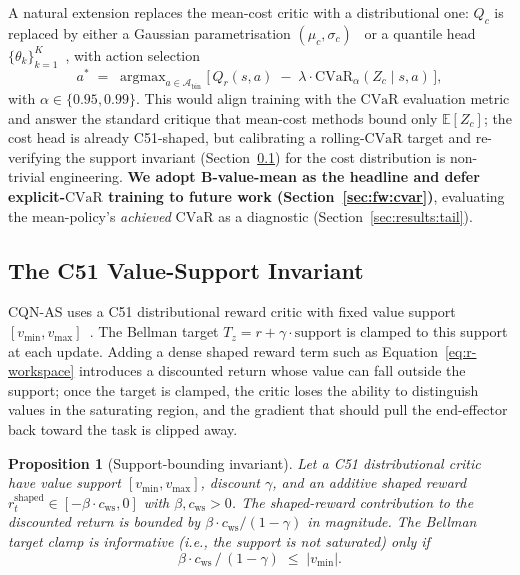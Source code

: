 \documentclass[11pt,a4paper]{report}
\newtheorem{proposition}[theorem]{Proposition}
\newcommand{\cvar}{\ensuremath{\mathrm{CVaR}}}
\newcommand{\cqnas}{CQN-AS}
\begin{document}
A natural extension replaces the mean-cost critic with a
distributional one: $Q_c$ is replaced by either a Gaussian
parametrisation $(\mu_c, \sigma_c)$~\cite{yang2021wcsac} or a
quantile head $\{\theta_k\}_{k=1}^K$~\cite{dabney2018qrdqn}, with
action selection
\begin{equation}
  a^* \;=\; \mathop{\mathrm{argmax}}_{a \in \mathcal{A}_{\mathrm{bin}}}
  \Big[\,Q_r(s,a) \;-\; \lambda \cdot \cvar_{\alpha}(Z_c \mid s, a)\,\Big],
\end{equation}
with $\alpha \in \{0.95, 0.99\}$. This would align training with the
\cvar{} evaluation metric and answer the standard critique that
mean-cost methods bound only $\mathbb{E}[Z_c]$; the cost head is
already C51-shaped, but calibrating a rolling-\cvar{} target and
re-verifying the support invariant
(Section~\ref{sec:method:lagrangian:support}) for the cost
distribution is non-trivial engineering. \textbf{We adopt
B-value-mean as the headline and defer explicit-\cvar{} training to
future work (Section~\ref{sec:fw:cvar})}, evaluating the
mean-policy's \emph{achieved} \cvar{} as a diagnostic
(Section~\ref{sec:results:tail}).

\subsection{The C51 Value-Support Invariant}
\label{sec:method:lagrangian:support}

\cqnas{} uses a C51 distributional reward critic with fixed value
support $[v_{\min}, v_{\max}]$~\cite{bellemare2017c51}. The Bellman
target $T_z = r + \gamma \cdot \mathrm{support}$ is clamped to this
support at each update. Adding a dense shaped reward term such as
Equation~\ref{eq:r-workspace} introduces a discounted return whose
value can fall outside the support; once the target is clamped, the
critic loses the ability to distinguish values in the saturating
region, and the gradient that should pull the end-effector back
toward the task is clipped away.

\begin{proposition}[Support-bounding invariant]
\label{lem:support-bound}
Let a C51 distributional critic have value support
$[v_{\min}, v_{\max}]$, discount $\gamma$, and an additive shaped
reward $r^{\mathrm{shaped}}_t \in [-\beta \cdot c_{\mathrm{ws}}, 0]$
with $\beta, c_{\mathrm{ws}} > 0$. The shaped-reward contribution
to the discounted return is bounded by
$\beta \cdot c_{\mathrm{ws}} / (1 - \gamma)$ in magnitude. The
Bellman target clamp is informative (i.e., the support is not
saturated) only if
\begin{equation}
  \beta \cdot c_{\mathrm{ws}} \,/\, (1-\gamma) \;\le\; |v_{\min}|.
  \label{eq:support-invariant}
\end{equation}
\end{proposition}
\end{document}
